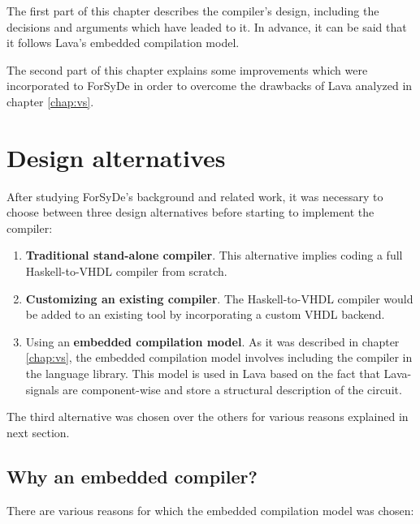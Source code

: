 The first part of this chapter describes the compiler's design, including
the decisions and arguments which have leaded to it. In advance, it
can be said that it follows Lava's embedded compilation model.

The second part of this chapter explains some improvements which were
incorporated to ForSyDe in order to overcome the drawbacks of Lava
analyzed in chapter \ref{chap:vs}.

\section{Design alternatives}

After studying ForSyDe's background and related work, it was necessary
to choose between three design alternatives before starting to
implement the compiler:

\begin{enumerate}[1)]
\item \textbf{Traditional stand-alone compiler}. This alternative
  implies coding a full Haskell-to-VHDL compiler from scratch.
\item \textbf{Customizing an existing compiler}. The Haskell-to-VHDL compiler
  would be added to an existing tool by incorporating a custom VHDL backend.
\item Using an \textbf{embedded compilation model}. As it was
  described in chapter \ref{chap:vs}, the embedded compilation model
  involves including the compiler in the language library. This
  model is used in Lava based on the fact that Lava-signals are
  component-wise and store a structural description of the circuit.
\end{enumerate}

The third alternative was chosen over the others for various reasons
explained in next section.

\subsection{Why an embedded compiler?}
There are various reasons for which the embedded compilation model was chosen:

